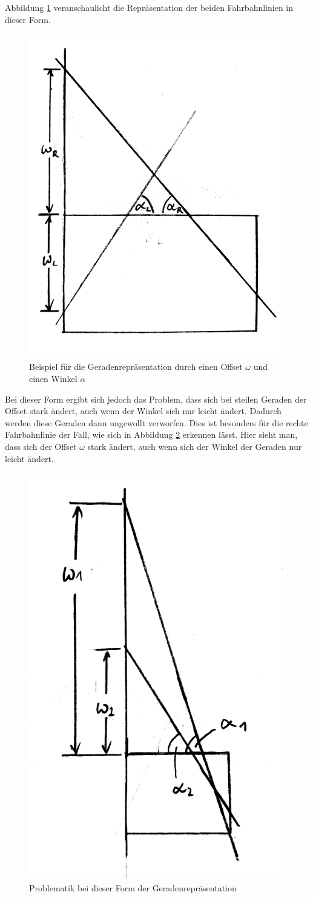 	Abbildung \ref{fig:alpha_omega1} veranschaulicht die Repräsentation der beiden Fahrbahnlinien in dieser Form.
	
	\begin{figure}[H]
		\centering
		\includegraphics[width=.5\linewidth]{images/alpha_omega1.jpg}
		\caption{Beispiel für die Geradenrepräsentation durch einen Offset $\omega$ und einen Winkel $\alpha$}
		\label{fig:alpha_omega1}
	\end{figure}

	Bei dieser Form ergibt sich jedoch das Problem, dass sich bei steilen Geraden der Offset stark ändert, auch wenn der Winkel sich nur leicht ändert. Dadurch werden diese Geraden dann ungewollt verworfen. Dies ist besonders für die rechte Fahrbahnlinie der Fall, wie sich in Abbildung \ref{fig:alpha_omega2} erkennen lässt. Hier sieht man, dass sich der Offset $\omega$ stark ändert, auch wenn sich der Winkel der Geraden nur leicht ändert.


	\begin{figure}[H]
		\centering
		\includegraphics[width=.3\linewidth]{images/alpha_omega2.jpg}
		\caption{Problematik bei dieser Form der Geradenrepräsentation}
		\label{fig:alpha_omega2}
	\end{figure}

